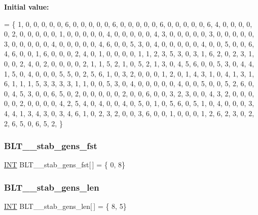 {\bfseries Initial value\+:}
\begin{DoxyCode}
= \{
1, 0, 0, 0, 0, 0, 6, 0, 0, 0, 0, 0, 6, 0, 0, 0, 0, 0, 6, 0, 0, 0, 0, 0, 6, 
4, 0, 0, 0, 0, 0, 2, 0, 0, 0, 0, 0, 1, 0, 0, 0, 0, 0, 4, 0, 0, 0, 0, 0, 4, 
3, 0, 0, 0, 0, 0, 3, 0, 0, 0, 0, 0, 3, 0, 0, 0, 0, 0, 4, 0, 0, 0, 0, 0, 4, 
6, 0, 0, 5, 3, 0, 4, 0, 0, 0, 0, 0, 4, 0, 0, 5, 0, 0, 6, 4, 6, 0, 0, 1, 6, 
0, 0, 0, 2, 4, 0, 1, 0, 0, 0, 0, 1, 1, 2, 3, 5, 3, 0, 3, 1, 6, 2, 0, 2, 3, 
1, 0, 0, 2, 4, 0, 2, 0, 0, 0, 0, 2, 1, 1, 5, 2, 1, 0, 5, 2, 1, 3, 0, 4, 5, 
6, 0, 0, 5, 3, 0, 4, 4, 1, 5, 0, 4, 0, 0, 0, 5, 5, 0, 2, 5, 6, 1, 0, 3, 2, 
0, 0, 0, 1, 2, 0, 1, 4, 3, 1, 0, 4, 1, 3, 1, 6, 1, 1, 1, 5, 3, 3, 3, 3, 1, 
1, 0, 0, 5, 3, 0, 4, 0, 0, 0, 0, 0, 4, 0, 0, 5, 0, 0, 5, 2, 6, 0, 0, 4, 5, 
3, 0, 0, 6, 5, 0, 2, 0, 0, 0, 0, 0, 2, 0, 0, 6, 0, 0, 3, 2, 3, 0, 0, 4, 3, 
2, 0, 0, 0, 0, 0, 2, 0, 0, 0, 0, 4, 2, 5, 4, 0, 4, 0, 0, 4, 0, 5, 0, 1, 0, 
5, 6, 0, 5, 1, 0, 4, 0, 0, 0, 3, 4, 4, 1, 3, 4, 3, 0, 3, 4, 6, 1, 0, 2, 3, 
2, 0, 0, 3, 6, 0, 0, 1, 0, 0, 0, 1, 2, 6, 2, 3, 0, 2, 2, 6, 5, 0, 6, 5, 2, 
\}
\end{DoxyCode}
\mbox{\label{data___b_l_t_8_c_a8258b0ac3f8f81c167388f524f555fca}} 
\subsubsection{\texorpdfstring{B\+L\+T\+\_\+\_\+stab\+\_\+gens\+\_\+fst}{BLT\_7\_stab\_gens\_fst}}
{\footnotesize\ttfamily \mbox{\hyperlink{galois_8h_a09fddde158a3a20bd2dcadb609de11dc}{I\+NT}} B\+L\+T\+\_\+\_\+stab\+\_\+gens\+\_\+fst\mbox{[}$\,$\mbox{]} = \{ 0, 8\}}

\mbox{\label{data___b_l_t_8_c_ae59534edf360e5227e733fb527f6b971}} 
\subsubsection{\texorpdfstring{B\+L\+T\+\_\+\_\+stab\+\_\+gens\+\_\+len}{BLT\_7\_stab\_gens\_len}}
{\footnotesize\ttfamily \mbox{\hyperlink{galois_8h_a09fddde158a3a20bd2dcadb609de11dc}{I\+NT}} B\+L\+T\+\_\+\_\+stab\+\_\+gens\+\_\+len\mbox{[}$\,$\mbox{]} = \{ 8, 5\}}

